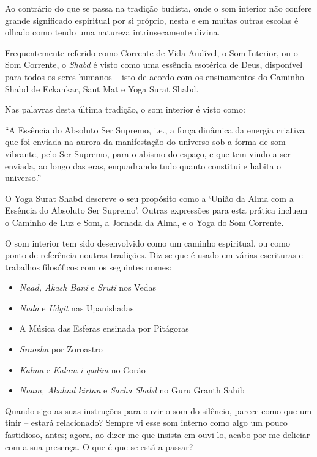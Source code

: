 Ao contrário do que se passa na tradição budista, onde o som interior
não confere grande significado espiritual por si próprio, nesta e em
muitas outras escolas é olhado como tendo uma natureza intrinsecamente
divina.

Frequentemente referido como Corrente de Vida Audível, o Som Interior,
ou o Som Corrente, o \emph{Shabd} é visto como uma essência esotérica de
Deus, disponível para todos os seres humanos -- isto de acordo com os
ensinamentos do Caminho Shabd de Eckankar, Sant Mat e Yoga Surat Shabd.

Nas palavras desta última tradição, o som interior é visto como:

``A Essência do Absoluto Ser Supremo, i.e., a força dinâmica da energia
criativa que foi enviada na aurora da manifestação do universo sob a
forma de som vibrante, pelo Ser Supremo, para o abismo do espaço, e que
tem vindo a ser enviada, ao longo das eras, enquadrando tudo quanto
constitui e habita o universo.''\cite{shabd}

O Yoga Surat Shabd descreve o seu propósito como a `União da Alma com a
Essência do Absoluto Ser Supremo'. Outras expressões para esta prática
incluem o Caminho de Luz e Som, a Jornada da Alma, e o Yoga do Som
Corrente.

O som interior tem sido desenvolvido como um caminho espiritual, ou como
ponto de referência noutras tradições. Diz-se que é usado em várias
escrituras e trabalhos filosóficos com os seguintes nomes:

\begin{itemize}
\item \emph{Naad, Akash Bani} e \emph{Sruti} nos Vedas
\item \emph{Nada} e \emph{Udgit} nas Upanishadas
\item A Música das Esferas ensinada por Pitágoras
\item \emph{Sraosha} por Zoroastro
\item \emph{Kalma} e \emph{Kalam-i-qadim} no Corão
\item \emph{Naam, Akahnd kirtan} e \emph{Sacha Shabd} no Guru Granth Sahib
\end{itemize}

 Quando sigo as suas instruções para ouvir o som do silêncio, parece
como que um tinir -- estará relacionado? Sempre vi esse som interno como
algo um pouco fastidioso, antes; agora, ao dizer-me que insista em
ouvi-lo, acabo por me deliciar com a sua presença. O que é que se está a
passar?

